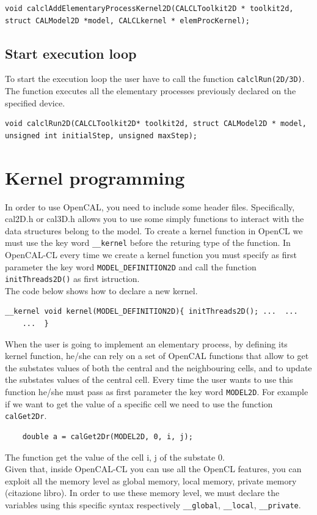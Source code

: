 \begin{lstlisting}
void calclAddElementaryProcessKernel2D(CALCLToolkit2D * toolkit2d,
struct CALModel2D *model, CALCLkernel * elemProcKernel);
\end{lstlisting}


\subsection{Start execution loop}

To start the execution loop the user have to call the function
\verb'calclRun(2D/3D)'. The function executes all the elementary
processes previously declared on the specified device.

\begin{lstlisting}
void calclRun2D(CALCLToolkit2D* toolkit2d, struct CALModel2D * model,
unsigned int initialStep, unsigned maxStep);
\end{lstlisting}


\section{Kernel programming} 

In order to use OpenCAL, you need to include some header files.
Specifically, cal2D.h or cal3D.h allows you to use some simply
functions to interact with the data structures belong to the model.
To create a kernel function in OpenCL we must use the key word
\verb'__kernel' before the returing type of the function. In
OpenCAL-CL every time we create a kernel function you must specify as
first parameter the key word \verb'MODEL_DEFINITION2D' and call the
function \verb'initThreads2D()' as first istruction.\\ The code below
shows how to declare a new kernel.
\begin{lstlisting} 
__kernel void kernel(MODEL_DEFINITION2D){ initThreads2D(); ...  ...
    ...  }
\end{lstlisting}

When the user is going to implement an elementary process, by defining
its kernel function, he/she can rely on a set of OpenCAL functions
that allow to get the substates values of both the central and the
neighbouring cells, and to update the substates values of the central
cell. Every time the user wants to use this function he/she must pass
as first parameter the key word \verb'MODEL2D'.  For example if we
want to get the value of a specific cell we need to use the function
\verb'calGet2Dr'.
\begin{lstlisting} 
	double a = calGet2Dr(MODEL2D, 0, i, j);
\end{lstlisting}
The function get the value of the cell i, j of the substate 0.\\ Given
that, inside OpenCAL-CL you can use all the OpenCL features, you can
exploit all the memory level as global memory, local memory, private
memory (citazione libro). In order to use these memory level, we must
declare the variables using this specific syntax respectively
\verb'__global', \verb'__local', \verb'__private'.


